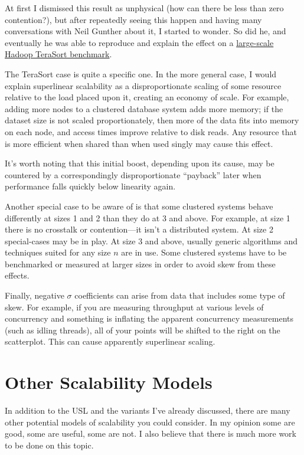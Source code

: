 \documentclass{vivid_layout}
\begin{document}
At first I dismissed this result as unphysical (how can there be less than zero
contention?), but after repeatedly seeing this happen and having many
conversations with Neil Gunther about it, I started to wonder. So did he, and
eventually he was able to reproduce and explain the effect on a
\href{https://queue.acm.org/detail.cfm?id=2789974}{large-scale Hadoop TeraSort
benchmark}.

The TeraSort case is quite a specific one. In the more general case, I would
explain superlinear scalability as a disproportionate scaling of some resource
relative to the load placed upon it, creating an economy of scale. For example,
adding more nodes to a clustered database system adds more memory; if the
dataset size is not scaled proportionately, then more of the data fits into
memory on each node, and access times improve relative to disk reads. Any
resource that is more efficient when shared than when used singly may cause this
effect.

It's worth noting that this initial boost, depending upon its cause, may be
countered by a correspondingly disproportionate ``payback'' later when
performance falls quickly below linearity again.

Another special case to be aware of is that some clustered systems behave
differently at sizes 1 and 2 than they do at 3 and above. For example, at size 1
there is no crosstalk or contention---it isn't a distributed system. At size 2
special-cases may be in play. At size 3 and above, usually generic algorithms
and techniques suited for any size $n$ are in use. Some clustered systems have
to be benchmarked or measured at larger sizes in order to avoid skew from these
effects.

Finally, negative $\sigma$ coefficients can arise from data that includes some
type of skew. For example, if you are measuring throughput at various levels of
concurrency and something is inflating the apparent concurrency measurements
(such as idling threads), all of your points will be shifted to the right on the
scatterplot. This can cause apparently superlinear scaling.

\newpage
\section{Other Scalability Models}

In addition to the USL and the variants I've already discussed, there are many
other potential models of scalability you could consider. In my opinion some are
good, some are useful, some are not. I also believe that there is much more work
to be done on this topic.
\end{document}
